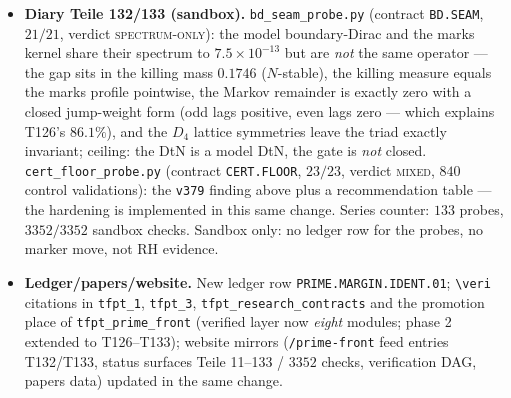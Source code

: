 \documentclass[11pt]{article}
\providecommand{\mE}{\textbf{[E]}}\providecommand{\mC}{\textbf{[C]}}
\begin{document}
\begin{itemize}[leftmargin=1.5em]
sum-of-squares route is nonnegative on $510/510$ test directions where the assembled float form is
negative on $2$. The eigenvalue check is \emph{retained and relabelled a diagnostic measurement}.
Ledger row \texttt{SEAM.S3.RP.01} reworded accordingly (method text: exact positive-mixture Gram
identity, eigenvalue check as diagnostic); \textbf{marker stays \mE\ --- no upgrade}. $7$ checks
(was $5$), \texttt{run\_all} green.
\item \textbf{Diary Teile 132/133 (sandbox).} \texttt{bd\_seam\_probe.py} (contract
\texttt{BD.SEAM}, $21/21$, verdict \textsc{spectrum-only}): the model boundary-Dirac and the marks
kernel share their spectrum to $7.5\times10^{-13}$ but are \emph{not} the same operator --- the gap
sits in the killing mass $0.1746$ ($N$-stable), the killing measure equals the marks profile
pointwise, the Markov remainder is exactly zero with a closed jump-weight form (odd lags positive,
even lags zero --- which explains T126's $86.1\%$), and the $D_4$ lattice symmetries leave the triad
exactly invariant; ceiling: the DtN is a model DtN, the gate is \emph{not} closed.
\texttt{cert\_floor\_probe.py} (contract \texttt{CERT.FLOOR}, $23/23$, verdict \textsc{mixed}, $840$
control validations): the \texttt{v379} finding above plus a recommendation table --- the hardening
is implemented in this same change. Series counter: $133$ probes, $3352/3352$ sandbox checks.
Sandbox only: no ledger row for the probes, no marker move, not RH evidence.
\item \textbf{Ledger/papers/website.} New ledger row \texttt{PRIME.MARGIN.IDENT.01};
\texttt{\textbackslash veri} citations in \texttt{tfpt\_1}, \texttt{tfpt\_3},
\texttt{tfpt\_research\_contracts} and the promotion place of \texttt{tfpt\_prime\_front} (verified
layer now \emph{eight} modules; phase 2 extended to T126--T133); website mirrors
(\texttt{/prime-front} feed entries T132/T133, status surfaces Teile 11--133 / $3352$ checks,
verification DAG, papers data) updated in the same change.
\end{itemize}
\end{document}
